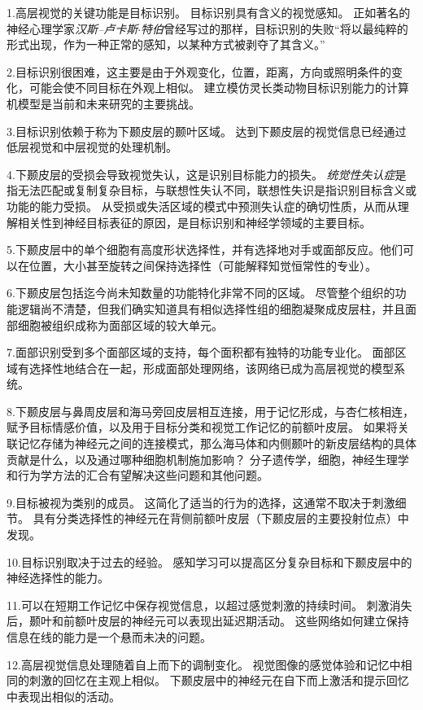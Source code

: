 1.高层视觉的关键功能是目标识别。
目标识别具有含义的视觉感知。
正如著名的神经心理学家\textit{汉斯–卢卡斯$\cdot$特伯}曾经写过的那样，目标识别的失败“将以最纯粹的形式出现，作为一种正常的感知，以某种方式被剥夺了其含义。” 


2.目标识别很困难，这主要是由于外观变化，位置，距离，方向或照明条件的变化，可能会使不同目标在外观上相似。
建立模仿灵长类动物目标识别能力的计算机模型是当前和未来研究的主要挑战。


3.目标识别依赖于称为下颞皮层的颞叶区域。
达到下颞皮层的视觉信息已经通过低层视觉和中层视觉的处理机制。


4.下颞皮层的受损会导致视觉失认，这是识别目标能力的损失。
\textit{统觉性失认症}是指无法匹配或复制复杂目标，与联想性失认不同，联想性失识是指识别目标含义或功能的能力受损。
从受损或失活区域的模式中预测失认症的确切性质，从而从理解相关性到神经目标表征的原因，是目标识别和神经学领域的主要目标。 


5.下颞皮层中的单个细胞有高度形状选择性，并有选择地对手或面部反应。他们可以在位置，大小甚至旋转之间保持选择性（可能解释知觉恒常性的专业）。


6.下颞皮层包括迄今尚未知数量的功能特化非常不同的区域。
尽管整个组织的功能逻辑尚不清楚，但我们确实知道具有相似选择性组的细胞凝聚成皮层柱，并且面部细胞被组织成称为面部区域的较大单元。


7.面部识别受到多个面部区域的支持，每个面积都有独特的功能专业化。
面部区域有选择性地结合在一起，形成面部处理网络，该网络已成为高层视觉的模型系统。


8.下颞皮层与鼻周皮层和海马旁回皮层相互连接，用于记忆形成，与杏仁核相连，赋予目标情感价值，以及用于目标分类和视觉工作记忆的前额叶皮层。
如果将关联记忆存储为神经元之间的连接模式，那么海马体和内侧颞叶的新皮层结构的具体贡献是什么，以及通过哪种细胞机制施加影响？
分子遗传学，细胞，神经生理学和行为学方法的汇合有望解决这些问题和其他问题。


9.目标被视为类别的成员。
这简化了适当的行为的选择，这通常不取决于刺激细节。
具有分类选择性的神经元在背侧前额叶皮层（下颞皮层的主要投射位点）中发现。


10.目标识别取决于过去的经验。
感知学习可以提高区分复杂目标和下颞皮层中的神经选择性的能力。


11.可以在短期工作记忆中保存视觉信息，以超过感觉刺激的持续时间。
刺激消失后，颞叶和前额叶皮层的神经元可以表现出延迟期活动。
这些网络如何建立保持信息在线的能力是一个悬而未决的问题。


12.高层视觉信息处理随着自上而下的调制变化。
视觉图像的感觉体验和记忆中相同的刺激的回忆在主观上相似。
下颞皮层中的神经元在自下而上激活和提示回忆中表现出相似的活动。


